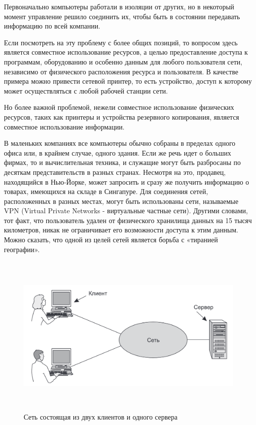     Первоначально компьютеры  работали в изоляции от других, но в некоторый момент управление решило соединить их, чтобы быть в состоянии передавать информацию по всей компании. 
    
    \par Если посмотреть на эту проблему с более общих позиций, то вопросом здесь является совместное использование ресурсов, а целью предоставление доступа к программам, оборудованию и особенно данным для любого пользователя сети, независимо от физического расположения ресурса и пользователя. В качестве примера можно привести сетевой принтер, то есть устройство, доступ к которому может осуществляться с любой рабочей станции сети.
    
    \par Но более важной проблемой, нежели совместное использование физических ресурсов, таких как принтеры и устройства резервного копирования, является совместное использование информации.
    
    \par В маленьких компаниях все компьютеры обычно собраны в пределах одного офиса или, в крайнем случае, одного здания. Если же речь идет о больших фирмах, то и вычислительная техника, и служащие могут быть разбросаны по десяткам представительств в разных странах. Несмотря на это, продавец, находящийся в Нью-Йорке, может запросить и сразу же получить информацию о товарах, имеющихся на складе в Сингапуре. Для соединения сетей, расположенных в разных местах, могут быть использованы сети, называемые VPN (Virtual Private Networks - виртуальные частные сети). Другими словами, тот факт, что пользователь удален от физического хранилища данных на 15 тысяч километров, никак не ограничивает его возможности доступа к этим данным. Можно сказать, что одной из целей сетей является борьба с «тиранией географии».
	
	\begin{figure}[h]
		\centering
		\includegraphics[height=8cm]{img/1.1} 
		\captionsetup{font=footnotesize}
		\caption{Сеть состоящая из двух клиентов и одного сервера} 
	\end{figure}
	

